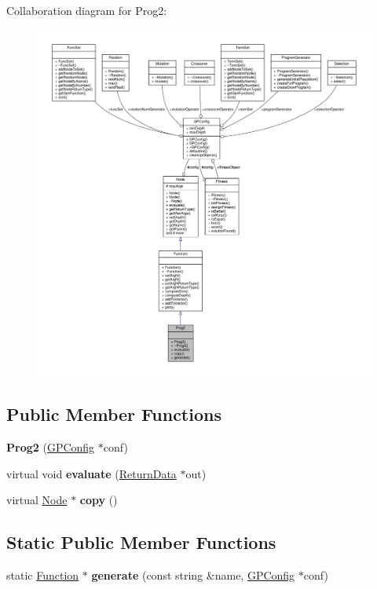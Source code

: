 Collaboration diagram for Prog2\+:
\nopagebreak
\begin{figure}[H]
\begin{center}
\leavevmode
\includegraphics[width=350pt]{classProg2__coll__graph}
\end{center}
\end{figure}
\subsection*{Public Member Functions}
\begin{DoxyCompactItemize}
\item 
\hypertarget{classProg2_a484a9c7ee3c73a01e04a6c40a724ba70}{}\label{classProg2_a484a9c7ee3c73a01e04a6c40a724ba70} 
{\bfseries Prog2} (\hyperlink{classGPConfig}{G\+P\+Config} $\ast$conf)
\item 
\hypertarget{classProg2_a119d9652b5ad96835e3aa49feeecfbda}{}\label{classProg2_a119d9652b5ad96835e3aa49feeecfbda} 
virtual void {\bfseries evaluate} (\hyperlink{classReturnData}{Return\+Data} $\ast$out)
\item 
\hypertarget{classProg2_ab08249153b686963d3991d25d78f6827}{}\label{classProg2_ab08249153b686963d3991d25d78f6827} 
virtual \hyperlink{classNode}{Node} $\ast$ {\bfseries copy} ()
\end{DoxyCompactItemize}
\subsection*{Static Public Member Functions}
\begin{DoxyCompactItemize}
\item 
\hypertarget{classProg2_a6c0efb0ed015721372c384c2dab8cf2e}{}\label{classProg2_a6c0efb0ed015721372c384c2dab8cf2e} 
static \hyperlink{classFunction}{Function} $\ast$ {\bfseries generate} (const string \&name, \hyperlink{classGPConfig}{G\+P\+Config} $\ast$conf)
\end{DoxyCompactItemize}
